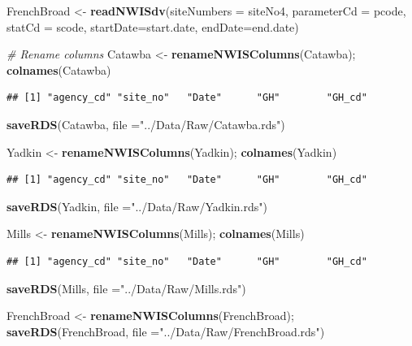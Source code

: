 \documentclass[12pt,]{article}
\newenvironment{Shaded}{\begin{snugshade}}{\end{snugshade}}
\newcommand{\CommentTok}[1]{\textcolor[rgb]{0.56,0.35,0.01}{\textit{#1}}}
\newcommand{\DataTypeTok}[1]{\textcolor[rgb]{0.13,0.29,0.53}{#1}}
\newcommand{\KeywordTok}[1]{\textcolor[rgb]{0.13,0.29,0.53}{\textbf{#1}}}
\newcommand{\NormalTok}[1]{#1}
\newcommand{\StringTok}[1]{\textcolor[rgb]{0.31,0.60,0.02}{#1}}
\begin{document}
\begin{Shaded}
\begin{Highlighting}[]
\NormalTok{FrenchBroad <-}\StringTok{ }\KeywordTok{readNWISdv}\NormalTok{(}\DataTypeTok{siteNumbers =}\NormalTok{ siteNo4, }
                    \DataTypeTok{parameterCd =}\NormalTok{ pcode, }
                    \DataTypeTok{statCd =}\NormalTok{ scode, }
                    \DataTypeTok{startDate=}\NormalTok{start.date, }
                    \DataTypeTok{endDate=}\NormalTok{end.date)}

\CommentTok{# Rename columns}
\NormalTok{Catawba <-}\StringTok{ }\KeywordTok{renameNWISColumns}\NormalTok{(Catawba); }
\KeywordTok{colnames}\NormalTok{(Catawba)}
\end{Highlighting}
\end{Shaded}

\begin{verbatim}
## [1] "agency_cd" "site_no"   "Date"      "GH"        "GH_cd"
\end{verbatim}

\begin{Shaded}
\begin{Highlighting}[]
\KeywordTok{saveRDS}\NormalTok{(Catawba, }\DataTypeTok{file =}\StringTok{"../Data/Raw/Catawba.rds"}\NormalTok{)}

\NormalTok{Yadkin <-}\StringTok{ }\KeywordTok{renameNWISColumns}\NormalTok{(Yadkin); }
\KeywordTok{colnames}\NormalTok{(Yadkin)}
\end{Highlighting}
\end{Shaded}

\begin{verbatim}
## [1] "agency_cd" "site_no"   "Date"      "GH"        "GH_cd"
\end{verbatim}

\begin{Shaded}
\begin{Highlighting}[]
\KeywordTok{saveRDS}\NormalTok{(Yadkin, }\DataTypeTok{file =}\StringTok{"../Data/Raw/Yadkin.rds"}\NormalTok{)}

\NormalTok{Mills <-}\StringTok{ }\KeywordTok{renameNWISColumns}\NormalTok{(Mills); }
\KeywordTok{colnames}\NormalTok{(Mills)}
\end{Highlighting}
\end{Shaded}

\begin{verbatim}
## [1] "agency_cd" "site_no"   "Date"      "GH"        "GH_cd"
\end{verbatim}

\begin{Shaded}
\begin{Highlighting}[]
\KeywordTok{saveRDS}\NormalTok{(Mills, }\DataTypeTok{file =}\StringTok{"../Data/Raw/Mills.rds"}\NormalTok{)}

\NormalTok{FrenchBroad <-}\StringTok{ }\KeywordTok{renameNWISColumns}\NormalTok{(FrenchBroad); }
\KeywordTok{saveRDS}\NormalTok{(FrenchBroad, }\DataTypeTok{file =}\StringTok{"../Data/Raw/FrenchBroad.rds"}\NormalTok{)}
\end{Highlighting}
\end{Shaded}
\end{document}
